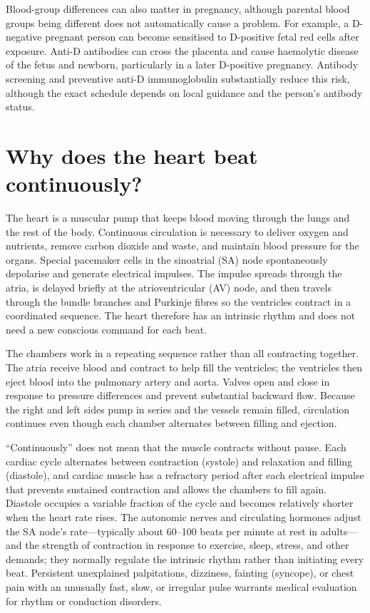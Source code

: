\documentclass[11pt,oneside]{report}
\begin{document}
Blood-group differences can also matter in pregnancy, although parental blood
groups being different does not automatically cause a problem. For example, a
D-negative pregnant person can become sensitised to D-positive fetal red cells
after exposure. Anti-D antibodies can cross the placenta and cause haemolytic
disease of the fetus and newborn, particularly in a later D-positive pregnancy.
Antibody screening and preventive anti-D immunoglobulin substantially reduce
this risk, although the exact schedule depends on local guidance and the
person's antibody status.

\section{Why does the heart beat continuously?}

The heart is a muscular pump that keeps blood moving through the lungs and the
rest of the body. Continuous circulation is necessary to deliver oxygen and
nutrients, remove carbon dioxide and waste, and maintain blood pressure for the
organs. Special pacemaker cells in the sinoatrial (SA) node spontaneously
depolarise and generate electrical impulses. The impulse spreads through the
atria, is delayed briefly at the atrioventricular (AV) node, and then travels
through the bundle branches and Purkinje fibres so the ventricles contract in a
coordinated sequence. The heart therefore has an intrinsic rhythm and does not
need a new conscious command for each beat.

The chambers work in a repeating sequence rather than all contracting together.
The atria receive blood and contract to help fill the ventricles; the
ventricles then eject blood into the pulmonary artery and aorta. Valves open and
close in response to pressure differences and prevent substantial backward
flow. Because the right and left sides pump in series and the vessels remain
filled, circulation continues even though each chamber alternates between
filling and ejection.

``Continuously'' does not mean that the muscle contracts without pause. Each
cardiac cycle alternates between contraction (systole) and relaxation and
filling (diastole), and cardiac muscle has a refractory period after each
electrical impulse that prevents sustained contraction and allows the chambers
to fill again. Diastole occupies a variable fraction of the cycle and
becomes relatively shorter when the heart rate rises. The autonomic nerves and
circulating hormones adjust the SA node's rate—typically about 60--100 beats
per minute at rest in adults—and the strength of contraction in response to
exercise, sleep, stress, and other demands; they normally regulate the intrinsic
rhythm rather than initiating every beat. Persistent unexplained palpitations,
dizziness, fainting (syncope), or chest pain with an unusually fast, slow, or
irregular pulse warrants medical evaluation for rhythm or conduction disorders.
\end{document}
